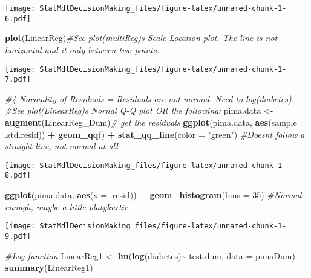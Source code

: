 \documentclass[
]{article}
\newenvironment{Shaded}{\begin{snugshade}}{\end{snugshade}}
\newcommand{\AttributeTok}[1]{\textcolor[rgb]{0.13,0.29,0.53}{#1}}
\newcommand{\CommentTok}[1]{\textcolor[rgb]{0.56,0.35,0.01}{\textit{#1}}}
\newcommand{\DecValTok}[1]{\textcolor[rgb]{0.00,0.00,0.81}{#1}}
\newcommand{\FunctionTok}[1]{\textcolor[rgb]{0.13,0.29,0.53}{\textbf{#1}}}
\newcommand{\NormalTok}[1]{#1}
\newcommand{\OtherTok}[1]{\textcolor[rgb]{0.56,0.35,0.01}{#1}}
\newcommand{\SpecialCharTok}[1]{\textcolor[rgb]{0.81,0.36,0.00}{\textbf{#1}}}
\newcommand{\StringTok}[1]{\textcolor[rgb]{0.31,0.60,0.02}{#1}}
\begin{document}
\texttt{[image: StatMdlDecisionMaking\_files/figure-latex/unnamed-chunk-1-6.pdf]}

\begin{Shaded}
\begin{Highlighting}[]
      \FunctionTok{plot}\NormalTok{(LinearReg)}\CommentTok{\#See plot(multiReg)\textquotesingle{}s Scale{-}Location plot. The line is not horizontal and it only between two points.}
\end{Highlighting}
\end{Shaded}

\texttt{[image: StatMdlDecisionMaking\_files/figure-latex/unnamed-chunk-1-7.pdf]}

\begin{Shaded}
\begin{Highlighting}[]
    \CommentTok{\#4 Normality of Residuals = Residuals are not normal. Need to log(diabetes).}
      \CommentTok{\#See plot(LinearReg)\textquotesingle{}s Nornal Q{-}Q plot OR the following: }
\NormalTok{      pima.data }\OtherTok{\textless{}{-}} \FunctionTok{augment}\NormalTok{(LinearReg\_Dum)}\CommentTok{\# get the residuals}
      \FunctionTok{ggplot}\NormalTok{(pima.data, }\FunctionTok{aes}\NormalTok{(}\AttributeTok{sample =}\NormalTok{ .std.resid)) }\SpecialCharTok{+}
\FunctionTok{geom\_qq}\NormalTok{() }\SpecialCharTok{+}
\FunctionTok{stat\_qq\_line}\NormalTok{(}\AttributeTok{color =} \StringTok{"green"}\NormalTok{) }\CommentTok{\#Doesn\textquotesingle{}t follow a straight line, not normal at all}
\end{Highlighting}
\end{Shaded}

\texttt{[image: StatMdlDecisionMaking\_files/figure-latex/unnamed-chunk-1-8.pdf]}

\begin{Shaded}
\begin{Highlighting}[]
     \FunctionTok{ggplot}\NormalTok{(pima.data, }\FunctionTok{aes}\NormalTok{(}\AttributeTok{x =}\NormalTok{ .resid)) }\SpecialCharTok{+}
\FunctionTok{geom\_histogram}\NormalTok{(}\AttributeTok{bins =} \DecValTok{35}\NormalTok{) }\CommentTok{\#Normal enough, maybe a little platykurtic}
\end{Highlighting}
\end{Shaded}

\texttt{[image: StatMdlDecisionMaking\_files/figure-latex/unnamed-chunk-1-9.pdf]}

\begin{Shaded}
\begin{Highlighting}[]
     \CommentTok{\#Log function}
\NormalTok{      LinearReg1 }\OtherTok{\textless{}{-}} \FunctionTok{lm}\NormalTok{(}\FunctionTok{log}\NormalTok{(diabetes)}\SpecialCharTok{\textasciitilde{}}\NormalTok{ test.dum, }\AttributeTok{data =}\NormalTok{ pimaDum)}
      \FunctionTok{summary}\NormalTok{(LinearReg1)}
\end{Highlighting}
\end{Shaded}
\end{document}
